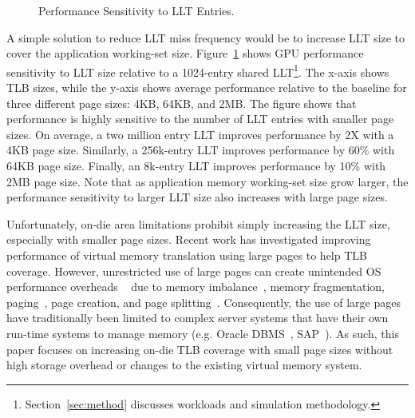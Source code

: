 \begin{figure}[t] 
\vspace{-0.0 in}
\centering
\centerline{}

	\caption{\small Performance Sensitivity to LLT Entries. \normalsize}

\label{fig:tlb_sensitivity} 
\vspace{-0.0 in}
\end{figure}

A simple solution to reduce LLT miss frequency would be to increase
LLT size to cover the application working-set size.
Figure~\ref{fig:tlb_sensitivity} shows GPU performance sensitivity to
LLT size relative to a 1024-entry shared
LLT\footnote{Section~\ref{sec:method} discusses workloads and
simulation methodology.}. The x-axis shows TLB sizes, while the y-axis
shows average performance relative to the baseline for three different
page sizes: 4KB, 64KB, and 2MB. The figure shows that performance is
highly sensitive to the number of LLT entries with smaller page sizes.
On average, a two million entry LLT improves performance by 2X with a
4KB page size. Similarly, a 256k-entry LLT improves performance by
60\% with 64KB page size. Finally, an 8k-entry LLT improves
performance by 10\% with 2MB page size. Note that as application
memory working-set size grow larger, the performance sensitivity to
larger LLT size also increases with large page sizes.


Unfortunately, on-die area limitations prohibit simply increasing the
LLT size, especially with smaller page sizes. Recent work has
investigated improving performance of virtual memory translation using
large pages to help TLB coverage. However, unrestricted use of large
pages can create unintended OS performance overheads
~\cite{SuperPageProblem, TwoPageSize} due to memory
imbalance~\cite{numa-harmful}, memory fragmentation,
paging~\cite{cameo}, page creation, and page
splitting~\cite{largepagevm}. Consequently, the use of large pages
have traditionally been limited to complex server systems that have
their own run-time systems to manage memory (e.g. Oracle
DBMS~\cite{oracle_dbms}, SAP~\cite{sap}). As such, this paper focuses
on increasing on-die TLB coverage with small page sizes without high
storage overhead or changes to the existing virtual memory system.


